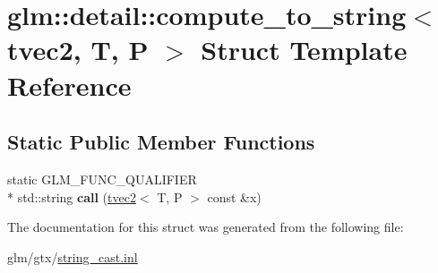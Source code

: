 \hypertarget{structglm_1_1detail_1_1compute__to__string_3_01tvec2_00_01T_00_01P_01_4}{\section{glm\-:\-:detail\-:\-:compute\-\_\-to\-\_\-string$<$ tvec2, T, P $>$ Struct Template Reference}
\label{structglm_1_1detail_1_1compute__to__string_3_01tvec2_00_01T_00_01P_01_4}
}
\subsection*{Static Public Member Functions}
\begin{DoxyCompactItemize}
\item 
\hypertarget{structglm_1_1detail_1_1compute__to__string_3_01tvec2_00_01T_00_01P_01_4_adf2e2875ee41bafdadd331fe4760e435}{static G\-L\-M\-\_\-\-F\-U\-N\-C\-\_\-\-Q\-U\-A\-L\-I\-F\-I\-E\-R \\*
std\-::string {\bfseries call} (\hyperlink{structglm_1_1tvec2}{tvec2}$<$ T, P $>$ const \&x)}\label{structglm_1_1detail_1_1compute__to__string_3_01tvec2_00_01T_00_01P_01_4_adf2e2875ee41bafdadd331fe4760e435}

\end{DoxyCompactItemize}


The documentation for this struct was generated from the following file\-:\begin{DoxyCompactItemize}
\item 
glm/gtx/\hyperlink{string__cast_8inl}{string\-\_\-cast.\-inl}\end{DoxyCompactItemize}
